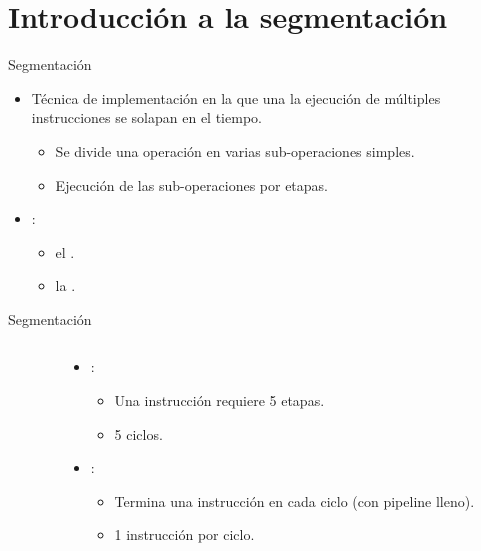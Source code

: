 \section{Introducción a la segmentación}

\begin{frame}[t]{Segmentación}
\begin{itemize}
  \item Técnica de implementación en la que una la ejecución de múltiples 
        instrucciones se solapan en el tiempo.
    \begin{itemize}
      \item Se divide una operación  en varias 
            sub-operaciones simples.
      \item Ejecución de las sub-operaciones por etapas.
    \end{itemize}
  \item {}:
    \begin{itemize}
      \item {} el .
      \item {} la .
    \end{itemize}
\end{itemize}
\end{frame}

\begin{frame}[t,fragile]{Segmentación}
\begin{columns}[T]
\begin{column}{0.6\textwidth}

\end{column}

\pause
\begin{column}[t]{.4\textwidth}
\begin{itemize}
  \item {}:
    \begin{itemize}
      \item Una instrucción requiere 5 etapas.
      \item 5 ciclos.
    \end{itemize}
  \item {}:
    \begin{itemize}
      \item Termina una instrucción en cada ciclo (con pipeline lleno).
      \item 1 instrucción por ciclo.
    \end{itemize}
\end{itemize}
\end{column}
\end{columns}
\end{frame}

